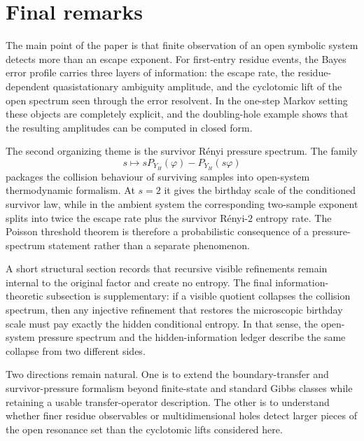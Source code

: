 \section{Final remarks}\label{sec:conclusion}

The main point of the paper is that finite observation of an open
symbolic system detects more than an escape exponent.  For first-entry
residue events, the Bayes error profile carries three layers of
information: the escape rate, the residue-dependent quasistationary
ambiguity amplitude, and the cyclotomic lift of the open spectrum seen
through the error resolvent.  In the one-step Markov setting these
objects are completely explicit, and the doubling-hole example shows
that the resulting amplitudes can be computed in closed form.

The second organizing theme is the survivor R\'enyi pressure spectrum.
The family
\[
  s\longmapsto sP_{Y_H}(\varphi)-P_{Y_H}(s\varphi)
\]
packages the collision behaviour of surviving samples into open-system
thermodynamic formalism.  At \(s=2\) it gives the birthday scale of the
conditioned survivor law, while in the ambient system the corresponding
two-sample exponent splits into twice the escape rate plus the survivor
R\'enyi-\(2\) entropy rate.  The Poisson threshold theorem is therefore a
probabilistic consequence of a pressure-spectrum statement rather than a
separate phenomenon.

A short structural section records that recursive visible refinements
remain internal to the original factor and create no entropy.  The final
information-theoretic subsection is supplementary: if a visible quotient
collapses the collision spectrum, then any injective refinement that
restores the microscopic birthday scale must pay exactly the hidden
conditional entropy.  In that sense, the open-system pressure spectrum
and the hidden-information ledger describe the same collapse from two
different sides.

Two directions remain natural.  One is to extend the boundary-transfer
and survivor-pressure formalism beyond finite-state and standard Gibbs
classes while retaining a usable transfer-operator description.  The
other is to understand whether finer residue observables or
multidimensional holes detect larger pieces of the open resonance set
than the cyclotomic lifts considered here.
